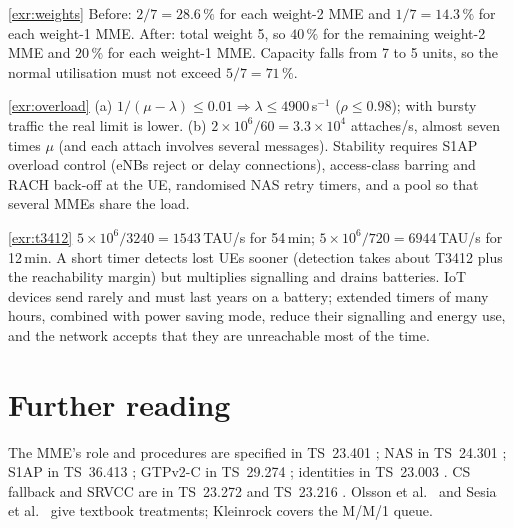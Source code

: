\documentclass[11pt,a4paper]{article}
\begin{document}
\begin{solutionbox}{\ref{exr:weights}}
Before: $2/7 = 28.6\,\%$ for each weight-2 MME and $1/7 = 14.3\,\%$ for each weight-1 MME. After: total weight 5,
so $40\,\%$ for the remaining weight-2 MME and $20\,\%$ for each weight-1 MME. Capacity falls from 7 to 5 units,
so the normal utilisation must not exceed $5/7 = 71\,\%$.
\end{solutionbox}

\begin{solutionbox}{\ref{exr:overload}}
(a) $1/(\mu-\lambda) \le 0.01 \Rightarrow \lambda \le 4900$\,s$^{-1}$ ($\rho \le 0.98$); with bursty traffic the real
limit is lower. (b) $2\times10^6/60 = 3.3\times10^4$ attaches/s, almost seven times $\mu$ (and each attach involves
several messages). Stability requires S1AP overload control (eNBs reject or delay connections), access-class
barring and RACH back-off at the UE, randomised NAS retry timers, and a pool so that several MMEs share the
load.
\end{solutionbox}

\begin{solutionbox}{\ref{exr:t3412}}
$5\times10^6/3240 = 1543$\,TAU/s for 54\,min; $5\times10^6/720 = 6944$\,TAU/s for 12\,min. A short timer detects lost UEs
sooner (detection takes about T3412 plus the reachability margin) but multiplies signalling and drains batteries.
IoT devices send rarely and must last years on a battery; extended timers of many hours, combined with power
saving mode, reduce their signalling and energy use, and the network accepts that they are unreachable most of
the time.
\end{solutionbox}

\section{Further reading}
The MME's role and procedures are specified in TS~23.401 \cite{ts23401}; NAS in TS~24.301 \cite{ts24301}; S1AP in
TS~36.413 \cite{ts36413}; GTPv2-C in TS~29.274 \cite{ts29274}; identities in TS~23.003 \cite{ts23003}. CS fallback
and SRVCC are in TS~23.272 \cite{ts23272} and TS~23.216 \cite{ts23216}. Olsson et al.\ \cite{olsson2013epc} and Sesia et
al.\ \cite{sesia2011lte} give textbook treatments; Kleinrock \cite{kleinrock1975queueing} covers the M/M/1 queue.

\printbibliography[heading=subbibliography,title={\ACNstrRefs}]
\end{document}
